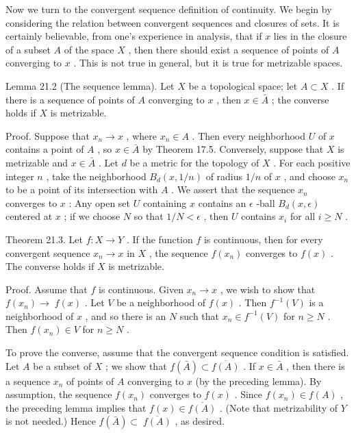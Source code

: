 \documentclass[10pt]{article}
\begin{document}
Now we turn to the convergent sequence definition of continuity. We begin by considering the relation between convergent sequences and closures of sets. It is certainly believable, from one’s experience in analysis, that if \(x\) lies in the closure of a subset \(A\) of the space \(X\) , then there should exist a sequence of points of \(A\) converging to \(x\) . This is not true in general, but it is true for metrizable spaces.

Lemma 21.2 (The sequence lemma). Let \(X\) be a topological space; let \(A \subset  X\) . If there is a sequence of points of \(A\) converging to \(x\) , then \(x \in  \bar{A}\) ; the converse holds if \(X\) is metrizable.

Proof. Suppose that \({x}_{n} \rightarrow  x\) , where \({x}_{n} \in  A\) . Then every neighborhood \(U\) of \(x\) contains a point of \(A\) , so \(x \in  \bar{A}\) by Theorem 17.5. Conversely, suppose that \(X\) is metrizable and \(x \in  \bar{A}\) . Let \(d\) be a metric for the topology of \(X\) . For each positive integer \(n\) , take the neighborhood \({B}_{d}\left( {x,1/n}\right)\) of radius \(1/n\) of \(x\) , and choose \({x}_{n}\) to be a point of its intersection with \(A\) . We assert that the sequence \({x}_{n}\) converges to \(x\) : Any open set \(U\) containing \(x\) contains an \(\epsilon\) -ball \({B}_{d}\left( {x,\epsilon }\right)\) centered at \(x\) ; if we choose \(N\) so that \(1/N < \epsilon\) , then \(U\) contains \({x}_{i}\) for all \(i \geq  N\) .

Theorem 21.3. Let \(f : X \rightarrow  Y\) . If the function \(f\) is continuous, then for every convergent sequence \({x}_{n} \rightarrow  x\) in \(X\) , the sequence \(f\left( {x}_{n}\right)\) converges to \(f\left( x\right)\) . The converse holds if \(X\) is metrizable.

Proof. Assume that \(f\) is continuous. Given \({x}_{n} \rightarrow  x\) , we wish to show that \(f\left( {x}_{n}\right)  \rightarrow \; f\left( x\right)\) . Let \(V\) be a neighborhood of \(f\left( x\right)\) . Then \({f}^{-1}\left( V\right)\) is a neighborhood of \(x\) , and so there is an \(N\) such that \({x}_{n} \in  {f}^{-1}\left( V\right)\) for \(n \geq  N\) . Then \(f\left( {x}_{n}\right)  \in  V\) for \(n \geq  N\) .

To prove the converse, assume that the convergent sequence condition is satisfied. Let \(A\) be a subset of \(X\) ; we show that \(f\left( \bar{A}\right)  \subset  \overline{f\left( A\right) }\) . If \(x \in  \bar{A}\) , then there is a sequence \({x}_{n}\) of points of \(A\) converging to \(x\) (by the preceding lemma). By assumption, the sequence \(f\left( {x}_{n}\right)\) converges to \(f\left( x\right)\) . Since \(f\left( {x}_{n}\right)  \in  f\left( A\right)\) , the preceding lemma implies that \(f\left( x\right)  \in  \overline{f\left( A\right) }\) . (Note that metrizability of \(Y\) is not needed.) Hence \(f\left( \bar{A}\right)  \subset \; \overline{f\left( A\right) }\) , as desired.
\end{document}
